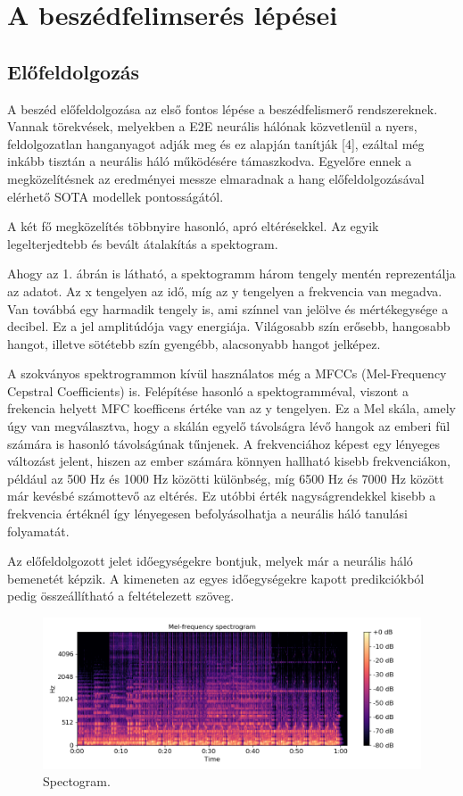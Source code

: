 \section{A beszédfelimserés lépései}

\subsection{Előfeldolgozás}

A beszéd előfeldolgozása az első fontos lépése a beszédfelismerő rendszereknek. Vannak törekvések, melyekben a E2E neurális hálónak közvetlenül a nyers, feldolgozatlan hanganyagot adják meg és ez alapján tanítják [4], ezáltal még inkább tisztán a neurális háló működésére támaszkodva. Egyelőre ennek a megközelítésnek az eredményei messze elmaradnak a hang előfeldolgozásával elérhető SOTA modellek pontosságától.

A két fő megközelítés többnyire hasonló, apró eltérésekkel. Az egyik legelterjedtebb és bevált átalakítás a spektogram.

Ahogy az 1. ábrán is látható, a spektogramm három tengely mentén reprezentálja az adatot. Az x tengelyen az idő, míg az y tengelyen a frekvencia van megadva. Van továbbá egy harmadik tengely is, ami színnel van jelölve és mértékegysége a decibel. Ez a jel amplitúdója vagy energiája. Világosabb szín erősebb, hangosabb hangot, illetve sötétebb szín gyengébb, alacsonyabb hangot jelképez.

A szokványos spektrogrammon kívül használatos még a MFCCs (Mel-Frequency Cepstral Coefficients) is. Felépítése hasonló a spektogramméval, viszont a frekencia helyett MFC koefficens értéke van az y tengelyen. Ez a Mel skála, amely úgy van megválasztva, hogy a skálán egyelő távolságra lévő hangok az emberi fül számára is hasonló távolságúnak tűnjenek. A frekvenciához képest egy lényeges változást jelent, hiszen az ember számára könnyen hallható kisebb frekvenciákon, például az 500 Hz és 1000 Hz közötti különbség, míg 6500 Hz és 7000 Hz között már kevésbé számottevő az eltérés. Ez utóbbi érték nagyságrendekkel kisebb a frekvencia értéknél így lényegesen befolyásolhatja a neurális háló tanulási folyamatát.

Az előfeldolgozott jelet időegységekre bontjuk, melyek már a neurális háló bemenetét képzik. A kimeneten az egyes időegységekre kapott predikciókból pedig összeállítható a feltételezett szöveg.

\begin{figure}[!ht]
\centering
\includegraphics[width=150mm, keepaspectratio]{figures/spectogram.png}
\caption{Spectogram.}
\label{fig:TeXstudio}
\end{figure}


